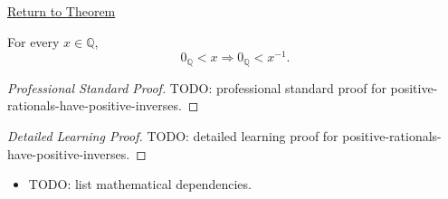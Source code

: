 \newpage
{}
\label{prf:positive-rationals-have-positive-inverses}

\begin{remark*}[Return]
\hyperref[cor:positive-rationals-have-positive-inverses]{Return to Theorem}
\end{remark*}

\begin{corollary*}
For every $x\in\mathbb{Q}$,
\[
0_{\mathbb{Q}}<x
\Longrightarrow
0_{\mathbb{Q}}<x^{-1}.
\]
\end{corollary*}

\begin{proof}[Professional Standard Proof]
\LRAProofBodyStart
TODO: professional standard proof for positive-rationals-have-positive-inverses.
\end{proof}

\begin{proof}[Detailed Learning Proof]
\LRAProofBodyStart
TODO: detailed learning proof for positive-rationals-have-positive-inverses.
\end{proof}

\begin{remark*}
\end{remark*}

\begin{dependencies}
\begin{itemize}
  \item TODO: list mathematical dependencies.
\end{itemize}
\end{dependencies}

\clearpage
